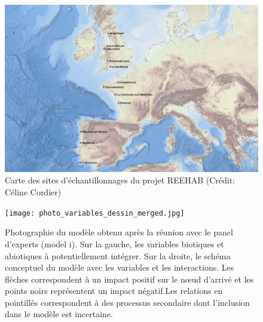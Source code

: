 \documentclass[12pt]{report}
\begin{document}
\setcounter{figure}{0}

\begin{figure}
    \centering
    \includegraphics[height = \textwidth, width = .9\textheight, angle = 90]{map_reehab.png}
    \caption[]{Carte des sites d'échantillonnages du projet REEHAB (Crédit: Céline Cordier)}
    \label{fig:1anx}
\end{figure}

\begin{figure}
    \centering
    \texttt{[image: photo\_variables\_dessin\_merged.jpg]}
    \caption[]{Photographie du modèle obtenu après la réunion avec le panel d’experts (model i). Sur la gauche, les variables biotiques et abiotiques à potentiellement intégrer. Sur la droite, le schéma conceptuel du modèle avec les variables et les interactions. Les flèches correspondent à un impact positif sur le nœud d’arrivé et les points noirs représentent un impact négatif.Les relations en pointillés correspondent à des processus secondaire dont l'inclusion dans le modèle est incertaine. }
    \label{fig:1}
\end{figure}
\end{document}
